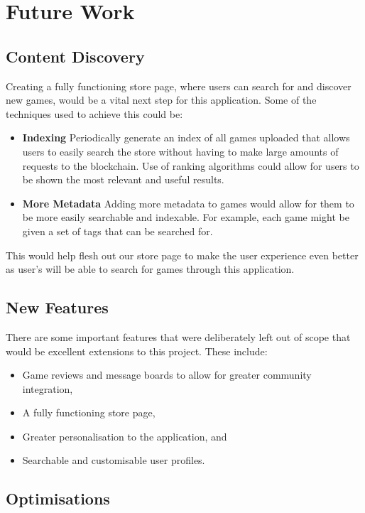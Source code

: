 \section{Future Work}

\subsection*{Content Discovery}
Creating a fully functioning store page, where users can search for and discover new games, would be a vital next step for this application. Some of the techniques used to achieve this could be:

\begin{itemize}
  \item \textbf{Indexing} Periodically generate an index of all games uploaded that allows users to easily search the store without having to make large amounts of requests to the blockchain. Use of ranking algorithms could allow for users to be shown the most relevant and useful results.
  \item \textbf{More Metadata} Adding more metadata to games would allow for them to be more easily searchable and indexable. For example, each game might be given a set of tags that can be searched for.
\end{itemize}

\vspace{2mm}\noindent
This would help flesh out our store page to make the user experience even better as user's will be able to search for games through this application.

\subsection*{New Features}

There are some important features that were deliberately left out of scope that would be excellent extensions to this project. These include:

\begin{itemize}
  \item Game reviews and message boards to allow for greater community integration,
  \item A fully functioning store page,
  \item Greater personalisation to the application, and
  \item Searchable and customisable user profiles.
\end{itemize}

\subsection*{Optimisations}


